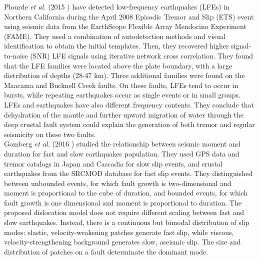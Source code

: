 \documentclass[main.tex]{subfiles}
\begin{document}
Plourde \textit{et al.} (2015 \cite{PLO_2015}) have detected low-frequency earthquakes (LFEs) in Northern California during the April 2008 Episodic Tremor and Slip (ETS) event using seismic data from the EarthScope Flexible Array Mendocino Experiment (FAME). They used a combination of autodetection methods and visual identification to obtain the initial templates. Then, they recovered higher signal-to-noise (SNR) LFE signals using iterative network cross correlation. They found that the LFE families were located above the plate boundary, with a large distribution of depths (28-47 km). Three additional families were found on the Maacama and Bucknell Creek faults. On these faults, LFEs tend to occur in bursts, while repeating earthquakes occur as single events or in small groups. LFEs and earthquakes have also different frequency contents. They conclude that dehydration of the mantle and further upward migration of water through the deep crustal fault system could explain the generation of both tremor and regular seismicity on these two faults. \\

Gomberg \textit{et al.} (2016 \cite{GOM_2016_GRL}) studied the relationship between seismic moment and duration for fast and slow earthquakes population. They used GPS data and tremor catalogs in Japan and Cascadia for slow slip events, and crustal earthquakes from the SRCMOD database for fast slip events. They distinguished between unbounded events, for which fault growth is two-dimensional and moment is proportional to the cube of duration, and bounded events, for which fault growth is one dimensional and moment is proportional to duration. The proposed dislocation model does not require different scaling between fast and slow earthquakes. Instead, there is a continuous but bimodal distribution of slip modes: elastic, velocity-weakening patches generate fast slip, while viscous, velocity-strengthening background generates slow, aseismic slip. The size and distribution of patches on a fault determinate the dominant mode.
\end{document}
